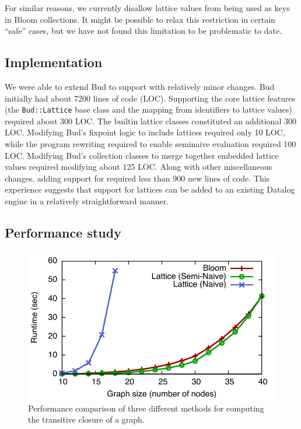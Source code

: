 For similar reasons, we currently disallow lattice values from being used as
keys in Bloom collections. It might be possible to relax this restriction in
certain ``safe'' cases, but we have not found this limitation to be problematic
to date.

\subsection{Implementation}
\label{sec:lattice-impl}

We were able to extend Bud to support \lang with relatively minor changes. Bud
initially had about 7200 lines of code (LOC). Supporting the core lattice
features (the \texttt{Bud::Lattice} base class and the mapping from identifiers
to lattice values) required about 300 LOC. The builtin lattice classes
constituted an additional 300 LOC. Modifying Bud's fixpoint logic to include
lattices required only 10 LOC, while the program rewriting required to enable
seminaive evaluation required 100 LOC. Modifying Bud's collection classes to
merge together embedded lattice values required modifying about 125 LOC. Along
with other miscellaneous changes, adding support for \lang required less than
900 new lines of code. This experience suggests that support for lattices can be
added to an existing Datalog engine in a relatively straightforward manner.

\subsection{Performance study}
\label{sec:lattice-perf}

\begin{figure}[t]
\includegraphics[width=\linewidth]{fig/sn_perf}
\caption{Performance comparison of three different methods for computing the
  transitive closure of a graph.}
\label{fig:tc-perf-graph}
\end{figure}

